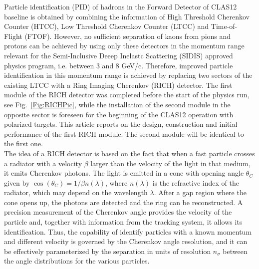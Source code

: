 \documentclass[5p,times,twocolumn]{elsarticle}
\begin{document}
Particle identification (PID) of hadrons in the Forward Detector of CLAS12 baseline is obtained by combining the information of High Threshold Cherenkov Counter (HTCC), Low Threshold Cherenkov Counter (LTCC) and Time-of-Flight (FTOF). However, no sufficient separation of kaons from pions and protons can be achieved by using only these detectors in the momentum range relevant for the Semi-Inclusive Deeep Inelastc Scattering (SIDIS) approved physics program, i.e. between 3 and 8 GeV/c. Therefore, improved particle identification in this momentum range is achieved by replacing two sectors of the existing LTCC with a Ring Imaging Cherenkov (RICH) detector. The first module of the RICH detector was completed before the start of the physics run, see Fig.~\ref{Fig:RICHPic}, while the installation of the second module in the opposite sector is foreseen for the beginning of the CLAS12 operation with polarized targets. This article reports on the design, construction and initial performance of the first RICH module. The second module will be identical to the first one.\\
The idea of a RICH detector is based on the fact that when a fast particle crosses a radiator with a velocity $\beta$ larger than the velocity of the light in that medium, it emits Cherenkov photons. The light is emitted in a cone with opening angle $\theta_C$ given by $\cos(\theta_C)=1/\beta n(\lambda)$, where $n(\lambda)$ is the refractive index of the radiator, which may depend on the wavelength $\lambda$. After a gap region where the cone opens up, the photons are detected and the ring can be reconstructed. A precision measurement of the Cherenkov angle provides the velocity of the particle and, together with information from the tracking system, it allows its identification. Thus, the capability of identify particles with a known momentum and different velocity is governed by the Cherenkov angle resolution, and it can be effectively parameterized by the separation in units of resolution $n_{\sigma}$ between the angle distributions for the various particles.
\end{document}
